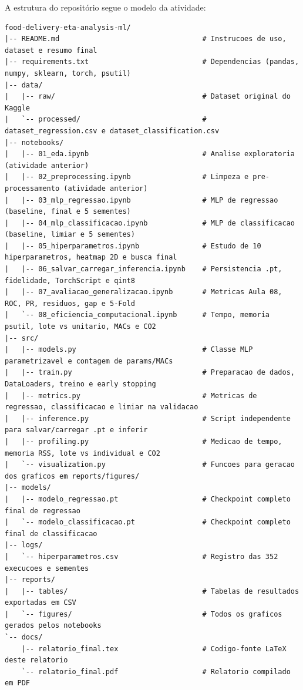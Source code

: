 \documentclass[12pt,a4paper]{article}
\begin{document}
A estrutura do repositório segue o modelo da atividade:
\begin{lstlisting}
food-delivery-eta-analysis-ml/
|-- README.md                                  # Instrucoes de uso, dataset e resumo final
|-- requirements.txt                           # Dependencias (pandas, numpy, sklearn, torch, psutil)
|-- data/
|   |-- raw/                                   # Dataset original do Kaggle
|   `-- processed/                             # dataset_regression.csv e dataset_classification.csv
|-- notebooks/
|   |-- 01_eda.ipynb                           # Analise exploratoria (atividade anterior)
|   |-- 02_preprocessing.ipynb                 # Limpeza e pre-processamento (atividade anterior)
|   |-- 03_mlp_regressao.ipynb                 # MLP de regressao (baseline, final e 5 sementes)
|   |-- 04_mlp_classificacao.ipynb             # MLP de classificacao (baseline, limiar e 5 sementes)
|   |-- 05_hiperparametros.ipynb               # Estudo de 10 hiperparametros, heatmap 2D e busca final
|   |-- 06_salvar_carregar_inferencia.ipynb    # Persistencia .pt, fidelidade, TorchScript e qint8
|   |-- 07_avaliacao_generalizacao.ipynb       # Metricas Aula 08, ROC, PR, residuos, gap e 5-Fold
|   `-- 08_eficiencia_computacional.ipynb      # Tempo, memoria psutil, lote vs unitario, MACs e CO2
|-- src/
|   |-- models.py                              # Classe MLP parametrizavel e contagem de params/MACs
|   |-- train.py                               # Preparacao de dados, DataLoaders, treino e early stopping
|   |-- metrics.py                             # Metricas de regressao, classificacao e limiar na validacao
|   |-- inference.py                           # Script independente para salvar/carregar .pt e inferir
|   |-- profiling.py                           # Medicao de tempo, memoria RSS, lote vs individual e CO2
|   `-- visualization.py                       # Funcoes para geracao dos graficos em reports/figures/
|-- models/
|   |-- modelo_regressao.pt                    # Checkpoint completo final de regressao
|   `-- modelo_classificacao.pt                # Checkpoint completo final de classificacao
|-- logs/
|   `-- hiperparametros.csv                    # Registro das 352 execucoes e sementes
|-- reports/
|   |-- tables/                                # Tabelas de resultados exportadas em CSV
|   `-- figures/                               # Todos os graficos gerados pelos notebooks
`-- docs/
    |-- relatorio_final.tex                    # Codigo-fonte LaTeX deste relatorio
    `-- relatorio_final.pdf                    # Relatorio compilado em PDF
\end{lstlisting}
\end{document}
